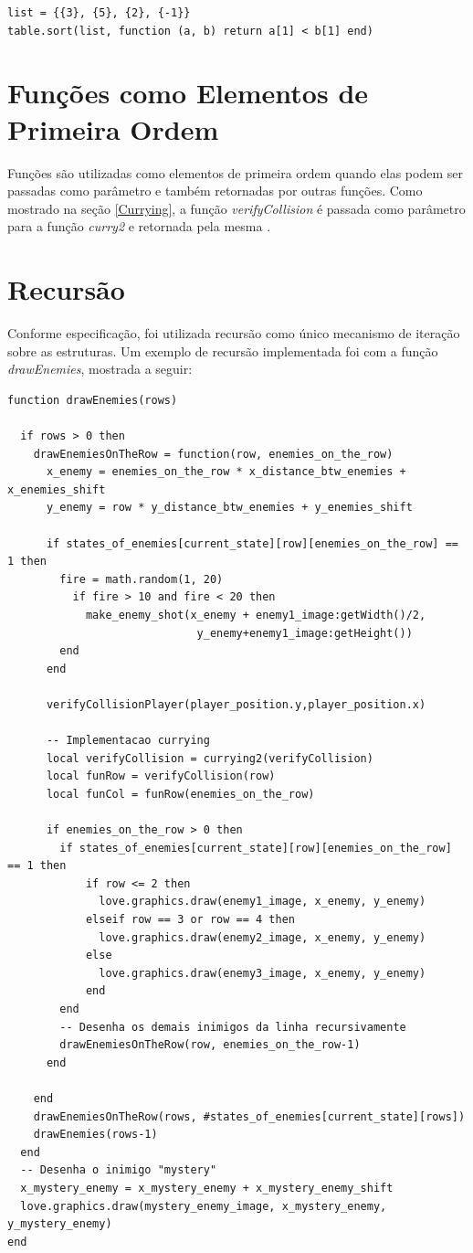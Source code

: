 \documentclass[rel_mlp]{iiufrgs}
\begin{document}
\begin{lstlisting}
list = {{3}, {5}, {2}, {-1}}
table.sort(list, function (a, b) return a[1] < b[1] end)
\end{lstlisting}

\section{Funções como Elementos de Primeira Ordem}

Funções são utilizadas como elementos de primeira ordem quando elas podem ser passadas como parâmetro e também retornadas por outras funções. Como mostrado na seção \ref{Currying}, a função \textit{verifyCollision} é passada como parâmetro para a função \textit{curry2} e retornada pela mesma \cite{FunctionsLua}.

\section{Recursão}

Conforme especificação, foi utilizada recursão como único mecanismo de iteração sobre as estruturas. Um exemplo de recursão implementada foi com a função \textit{drawEnemies}, mostrada a seguir:

\begin{lstlisting}
function drawEnemies(rows)

  if rows > 0 then
    drawEnemiesOnTheRow = function(row, enemies_on_the_row)
      x_enemy = enemies_on_the_row * x_distance_btw_enemies + x_enemies_shift
      y_enemy = row * y_distance_btw_enemies + y_enemies_shift

      if states_of_enemies[current_state][row][enemies_on_the_row] == 1 then
        fire = math.random(1, 20)
          if fire > 10 and fire < 20 then
            make_enemy_shot(x_enemy + enemy1_image:getWidth()/2,
            				 y_enemy+enemy1_image:getHeight())
        end
      end

      verifyCollisionPlayer(player_position.y,player_position.x)

      -- Implementacao currying
      local verifyCollision = currying2(verifyCollision)
      local funRow = verifyCollision(row)
      local funCol = funRow(enemies_on_the_row)

      if enemies_on_the_row > 0 then
        if states_of_enemies[current_state][row][enemies_on_the_row] == 1 then
            if row <= 2 then
              love.graphics.draw(enemy1_image, x_enemy, y_enemy)
            elseif row == 3 or row == 4 then
              love.graphics.draw(enemy2_image, x_enemy, y_enemy)
            else
              love.graphics.draw(enemy3_image, x_enemy, y_enemy)
            end
        end
        -- Desenha os demais inimigos da linha recursivamente
        drawEnemiesOnTheRow(row, enemies_on_the_row-1)
      end

    end
    drawEnemiesOnTheRow(rows, #states_of_enemies[current_state][rows])
    drawEnemies(rows-1)
  end
  -- Desenha o inimigo "mystery"
  x_mystery_enemy = x_mystery_enemy + x_mystery_enemy_shift
  love.graphics.draw(mystery_enemy_image, x_mystery_enemy, y_mystery_enemy)
end

\end{lstlisting}
\end{document}
